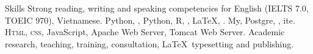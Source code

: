 
\begin{rubric}{Skills}
\entry*[Languages]
	Strong reading, writing and speaking competencies for English (IELTS 7.0, TOEIC 970), Vietnamese.
\entry*[Coding]
	Python, , Python, R, , \LaTeX, .
\entry*[Databases]
	My, Postgre, , ite.
	\textsc{Html, css}, JavaScript, Apache Web Server, Tomcat Web Server.
\entry*[Misc.]
	Academic research, teaching, training, consultation, \LaTeX\ typesetting and publishing.
\end{rubric}
